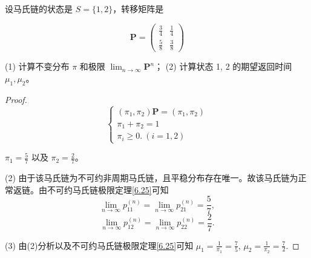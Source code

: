 \documentclass[lang=cn,10pt,thmcnt=section]{elegantbook}
\begin{document}
\begin{example}
	设马氏链的状态是 \( S = \{1, 2\} \)，转移矩阵是

\[
\mathbf{P} = \left(
\begin{array}{cc}
\frac{3}{4} & \frac{1}{4} \\
\frac{5}{8} & \frac{3}{8}
\end{array}
\right)
\]

(1) 计算不变分布 \(\pi\) 和极限 \(\lim_{n \to \infty} \mathbf{P}^n\)；
(2) 计算状态 1, 2 的期望返回时间 \(\mu_1, \mu_2\)。

\end{example}
\begin{proof}
	\[
\begin{cases}
(\pi_1, \pi_2) \mathbf{P} = (\pi_1, \pi_2) \\
\pi_1 + \pi_2 = 1 \\
\pi_i \geq 0. \ (i = 1, 2)
\end{cases}
\]

\(\pi_1 = \frac{5}{7}\) 以及 \(\pi_2 = \frac{2}{7}\)。

(2) 由于该马氏链为不可约非周期马氏链，且平稳分布存在唯一。故该马氏链为正常返链。由不可约马氏链极限定理\ref{6.25}可知
\[
\lim_{n \to \infty} p_{11}^{(n)} = \lim_{n \to \infty} p_{21}^{(n)} = \frac{5}{7},
\]
\[
\lim_{n \to \infty} p_{12}^{(n)} = \lim_{n \to \infty} p_{22}^{(n)} = \frac{2}{7}.
\]

(3) 由(2)分析以及不可约马氏链极限定理\ref{6.25}可知 \(\mu_1 = \frac{1}{\pi_1} = \frac{7}{5}\), \(\mu_2 = \frac{1}{\pi_2} = \frac{7}{2}\).
\end{proof}
\end{document}
